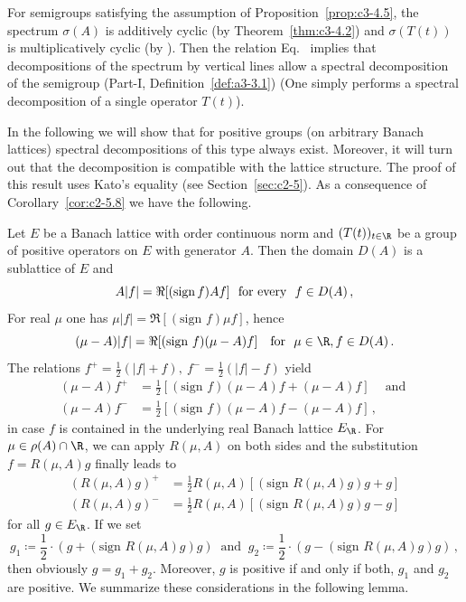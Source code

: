 For semigroups satisfying the assumption of Proposition~\ref{prop:c3-4.5}, the spectrum $\sigma(A)$ is additively cyclic (by Theorem~\ref{thm:c3-4.2}) and $\sigma(T(t))$ is multiplicatively cyclic
(by \textcite[V.Theorem~4.4]{schaefer:1974}). 
Then the relation Eq.~ implies that
decompositions of the spectrum by vertical lines allow a spectral decomposition%
 of the semigroup (\cf Part-I, Definition~\ref{def:a3-3.1}) (One simply performs a spectral decomposition of a single operator $T(t)$). 

In the following we will show that for positive groups (on arbitrary Banach
lattices) spectral decompositions of this type always exist. 
Moreover,
it will turn out that the decomposition is compatible with the lattice
structure. 
The proof of this result uses Kato's equality (see Section~\ref{sec:c2-5}).%
As a consequence of Corollary~\ref{cor:c2-5.8}  we have the following.

Let $E$ be a Banach lattice with order continuous norm and $(T(t))_{t \in \R }$
be a group of positive operators on $E$ with generator $A$.
Then the domain $D(A)$ is a sublattice of\/ $E$ and
\begin{equation}\label{eq:c3-4.8}
	A|f| = \Re [(\text{sign\,} f)Af] \ \text{ for every } \ f \in D(A)\,,
\end{equation}
For real $\mu$ one has $\mu|f| = \Re [(\text{sign } f)\mu f]$, hence
\[
(\mu - A)|f| = \Re[(\text{sign } f)(\mu - A)f] \ \ \text{ for } \ \mu \in \R , f \in D(A)\,.
\]
The relations $f^+ = \frac{1}{2}(|f| + f), \ f^- = \frac{1}{2}(|f| - f)$ yield
\begin{align*}
(\mu - A)f^+ &= \frac{1}{2}[(\text{sign } f)(\mu - A)f + (\mu - A)f] \quad\ \text{and }\\
(\mu - A)f^- &= \frac{1}{2}[(\text{sign } f)(\mu - A)f - (\mu - A)f]\,,
\end{align*}
in case $f$ is contained in the underlying real Banach lattice $E_{\R }$.
For $\mu \in \rho(A) \cap \R $, we can apply $R(\mu,A)$ on both sides and the substitution $f = R(\mu,A)g$ finally leads to
\begin{equation}\label{eq:c3-4.9}
	\begin{split}
	(R(\mu,A)g)^+ &= \frac{1}{2}R(\mu,A) [(\text{sign } R(\mu,A)g)g + g] \\
	(R(\mu,A)g)^- &= \frac{1}{2}R(\mu,A) [(\text{sign } R(\mu,A)g)g - g]
	\end{split}
\end{equation}
for all $g \in E_{\R }$. 
If we set
\[ 
g_1 \coloneqq \frac{1}{2}\cdot(g + (\text{sign } R(\mu,A)g)g) \ \text{ and } \ 
g_2 \coloneqq \frac{1}{2}\cdot(g - (\text{sign } R(\mu,A)g)g)\,,
\]
then obviously $g = g_1 + g_2$. Moreover, $g$ is positive if and only if
both, $g_1$ and $g_2$ are positive. We summarize these considerations in the following lemma.

